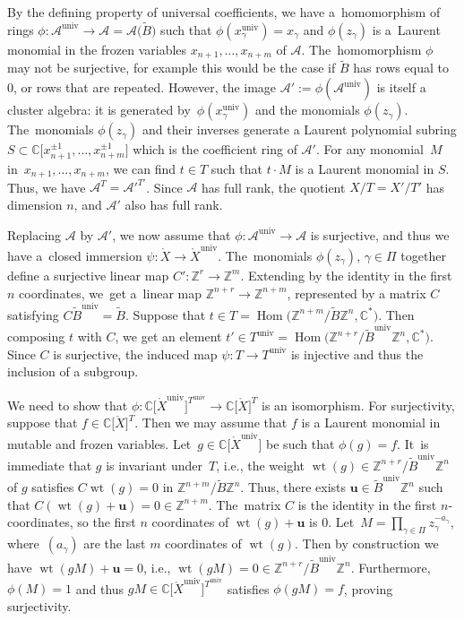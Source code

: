 \documentclass[pdftex]{sigma}%
\def\C{{\mathbb C}}
\def\Z{{\mathbb Z}}
\def\A{{\mathcal{A}}}
\def\Xo{{\mathring{X}}}
\def\u{{\mathbf{u}}}
\def\Hom{\operatorname{Hom}}
\def\univ{{\operatorname{univ}}}
\def\tB{{\tilde B}}
\def\wt{\operatorname{wt}}
\def\tB{{\tilde B}}
\numberwithin{equation}{section}
\begin{document}
\bigskip{}
By the defining property of universal coefficients, we have a~homomorphism of rings $\phi\colon \A^\univ \to \A= \A\big(\tB\big)$ such that $\phi(x_\gamma^\univ) = x_\gamma$ and $\phi(z_\gamma)$ is a~Laurent monomial in the frozen variables $x_{n+1},\dots,x_{n+m}$ of $\A$. The~homomorphism $\phi$ may not be surjective, for example this would be the case if $\tB$ has rows equal to 0, or rows that are repeated.
However, the image $\A' := \phi(\A^\univ)$ is itself a cluster algebra: it is generated by~$\phi(x_\gamma^\univ)$ and the monomials $\phi(z_\gamma)$. The~monomials $\phi(z_\gamma)$ and their inverses generate a Laurent polynomial subring $S \subset \C\big[x_{n+1}^{\pm 1}, \dots, x_{n+m}^{\pm 1}\big]$ which is the coefficient ring of $\A'$. For any monomial~$M$ in~$x_{n+1},\dots,x_{n+m}$, we can find $t \in T$ such that $t \cdot M$ is a Laurent monomial in $S$. Thus, we have $\A^T = \A'^{T'}$. Since $\A$ has full rank, the quotient $X/T = X'/T'$ has dimension $n$, and $\A'$ also has full rank.

Replacing $\A$ by $\A'$, we now assume that $\phi\colon \A^\univ \to \A$ is surjective, and thus we have a~clo\-sed immersion $\psi\colon \Xo \to \Xo^\univ$. The~monomials $\phi(z_\gamma)$, $\gamma \in \Pi$ together define a sur\-jec\-tive linear map $C'\colon \Z^r \to \Z^m$. Extending by the identity in the first $n$ coordinates, we~get a~linear map $\Z^{n+r} \to \Z^{n+m}$, represented by a matrix $C$ satisfying $C \tB^\univ = \tB$. Suppose that $t \in T= \Hom\big(\Z^{n+m}/\tB \Z^n, \C^\ast\big)$. Then composing $t$ with $C$, we get an element $t' \in T^\univ =\Hom\big(\Z^{n+r}/\tB^\univ \Z^n,\C^\ast\big)$. Since $C$ is surjective, the induced map $\psi\colon T \to T^\univ$ is injective and thus the inclusion of a subgroup.

We need to show that $\phi\colon \C\big[\Xo^\univ\big]^{T^\univ} \to \C\big[\Xo\big]^T$ is an isomorphism. For surjectivity, suppose that $f \in \C\big[\Xo\big]^T$. Then we may assume that $f$ is a Laurent monomial in mutable and frozen variables. Let~$g \in \C\big[\Xo^\univ\big]$ be such that $\phi(g) = f$. It~is immediate that $g$ is invariant under~$T$, i.e., the weight $\wt(g) \in \Z^{n+r}/\tB^\univ \Z^n$ of $g$ satisfies $C \wt(g) = 0$ in $\Z^{n+m}/\tB \Z^n$. Thus, there exists $\u \in \tB^\univ \Z^n$ such that $C(\wt(g) + \u) = 0 \in \Z^{n+m}$. The~matrix $C$ is the identity in the first $n$-coordinates, so the first $n$ coordinates of $\wt(g)+\u$ is 0. Let~$M = \prod_{\gamma \in \Pi} z_\gamma^{-a_\gamma}$, where~$(a_\gamma)$ are the last $m$ coordinates of $\wt(g)$. Then by construction we have $\wt(gM)+\u = 0$, i.e., $\wt(gM) = 0 \in \Z^{n+r}/\tB^\univ \Z^n$. Furthermore, $\phi(M) = 1$ and thus $gM \in \C\big[\Xo^\univ\big]^{T^\univ}$ satisfies $\phi(gM) = f$, proving surjectivity.
\end{document}
